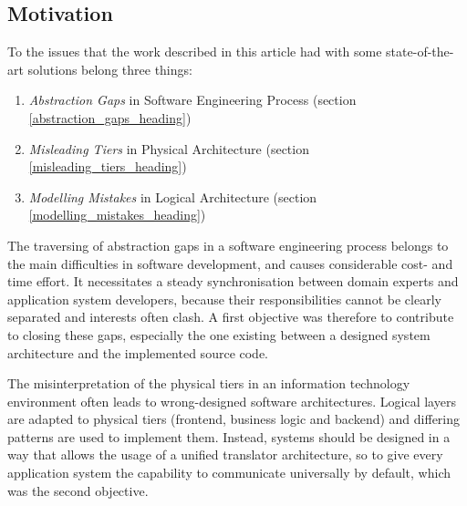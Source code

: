 %
%
%
%
%
%
%

\subsection{Motivation}
\label{motivation_heading}

To the issues that the work described in this article had with some
state-of-the-art solutions belong three things:

\begin{enumerate}
    \item \emph{Abstraction Gaps} in Software Engineering Process (section
        \ref{abstraction_gaps_heading})
    \item \emph{Misleading Tiers} in Physical Architecture (section
        \ref{misleading_tiers_heading})
    \item \emph{Modelling Mistakes} in Logical Architecture (section
        \ref{modelling_mistakes_heading})
\end{enumerate}

The traversing of abstraction gaps in a software engineering process belongs to
the main difficulties in software development, and causes considerable cost-
and time effort. It necessitates a steady synchronisation between domain
experts and application system developers, because their responsibilities
cannot be clearly separated and interests often clash. A first objective was
therefore to contribute to closing these gaps, especially the one existing
between a designed system architecture and the implemented source code.

The misinterpretation of the physical tiers in an information technology
environment often leads to wrong-designed software architectures. Logical
layers are adapted to physical tiers (frontend, business logic and backend) and
differing patterns are used to implement them. Instead, systems should be
designed in a way that allows the usage of a unified translator architecture,
so to give every application system the capability to communicate universally
by default, which was the second objective.

